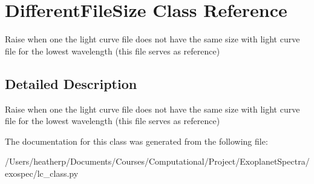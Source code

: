 \hypertarget{class_different_file_size}{}\section{Different\+File\+Size Class Reference}
\label{class_different_file_size}


Raise when one the light curve file does not have the same size with light curve file for the lowest wavelength (this file serves as reference)  




\subsection{Detailed Description}
Raise when one the light curve file does not have the same size with light curve file for the lowest wavelength (this file serves as reference) 

The documentation for this class was generated from the following file\+:\begin{DoxyCompactItemize}
\item 
/\+Users/heatherp/\+Documents/\+Courses/\+Computational/\+Project/\+Exoplanet\+Spectra/exospec/lc\+\_\+class.\+py\end{DoxyCompactItemize}
